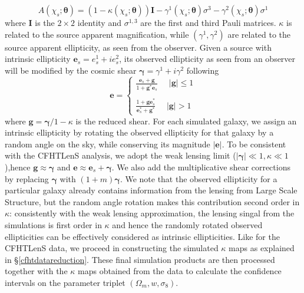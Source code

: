 \documentclass[reprint,aps,prd,superscriptaddress,showkeys,showpacs]{revtex4-1}
\begin{document}
%
\begin{equation}
A(\chi_s;\pmb{\theta}) = (1-\kappa(\chi_s;\pmb{\theta}))\pmb{I} - \gamma^1(\chi_s;\pmb{\theta})\sigma^3 - \gamma^2(\chi_s;\pmb{\theta})\sigma^1
\end{equation}  
%
where $\pmb{I}$ is the $2\times2$ identity and $\sigma^{1,3}$ are the first and third Pauli matrices. $\kappa$ is related to the source apparent magnification, while $(\gamma^1,\gamma^2)$ are related to the source apparent ellipticity, as seen from the observer. Given a source with intrinsic ellipticity $\mathbf{e}_s=e^1_s + ie^2_s$, its observed ellipticity as seen from an observer will be modified by the cosmic shear $\pmb{\gamma}=\gamma^1 + i\gamma^2$ following
%
\begin{equation}
\mathbf{e} = 
\begin{cases}
\frac{\mathbf{e}_s+\mathbf{g}}{1+\mathbf{g}^*\mathbf{e}_s} \,\,\,\,\,\,\,\, \vert \mathbf{g}\vert \leq 1 \\ \\
\frac{1+\mathbf{ge}_s^*}{\mathbf{e}_s^* + \mathbf{g}^*} \,\,\,\,\,\,\,\, \vert \mathbf{g}\vert > 1
\end{cases}
\end{equation}
%
where $\mathbf{g} = \pmb{\gamma}/1-\kappa$ is the reduced shear. For each simulated galaxy, we assign an intrinsic ellipticity by rotating the observed ellipticity for that galaxy by a random angle on the sky, while conserving its magnitude $\vert\mathbf{e}\vert$. To be consistent with the CFHTLenS analysis, we adopt the weak lensing limit ($\vert\pmb{\gamma}\vert\ll1,\kappa\ll1$),hence $\mathbf{g}\approx\pmb{\gamma}$ and $\mathbf{e}\approx \mathbf{e}_s+\pmb{\gamma}$. We also add the multiplicative shear corrections by replacing $\pmb{\gamma}$ with $(1+m)\pmb{\gamma}$. We note that the observed ellipticity for a particular galaxy already contains information from the lensing from Large Scale Structure, but the random angle rotation makes this contribution second order in $\kappa$: consistently with the weak lensing approximation, the lensing singal from the simulations is first order in $\kappa$ and hence the randomly rotated observed ellipticities can be effectively considered as intrinsic ellipticities. Like for the CFHTLenS data, we proceed in constructing the simulated $\kappa$ maps as explained in \S\ref{cfhtdatareduction}. These final simulation products are then processed together with the $\kappa$ maps obtained from the data to calculate the confidence intervals on the parameter triplet $(\Omega_m,w,\sigma_8)$.
\end{document}
